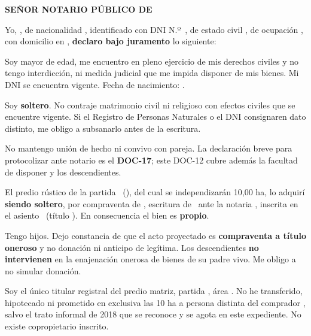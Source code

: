 \documentclass[12pt,a4paper]{article}
\begin{document}


\noindent \textbf{SEÑOR NOTARIO PÚBLICO DE \MakeUppercase{\NotariaCiudad}}

\vspace{0.2em}
\noindent Yo, \textbf{\VendedorNombreCompleto}, de nacionalidad \VendedorNacionalidad, identificado con DNI N.º\ \textbf{\VendedorDNI}, de estado civil \textbf{\VendedorEstadoCivil}, de ocupación \VendedorOcupacion, con domicilio en \VendedorDomicilio, \textbf{declaro bajo juramento} lo siguiente:

Soy mayor de edad, me encuentro en pleno ejercicio de mis derechos civiles y no tengo interdicción, ni medida judicial que me impida disponer de mis bienes. Mi DNI se encuentra vigente. Fecha de nacimiento: \VendedorFechaNac.

Soy \textbf{soltero}. No contraje matrimonio civil ni religioso con efectos civiles que se encuentre vigente. Si el Registro de Personas Naturales o el DNI consignaren dato distinto, me obligo a subsanarlo antes de la escritura.

No mantengo unión de hecho ni convivo con pareja. La declaración breve para protocolizar ante notario es el \textbf{DOC-17}; este DOC-12 cubre además la facultad de disponer y los descendientes.

El predio rústico de la partida \PartidaMatriz\ (\OficinaRegistral), del cual se independizarán 10,00 ha, lo adquirí \textbf{siendo soltero}, por compraventa de \VendedoresAnteriores, escritura de \FechaAdquisicionMatriz\ ante la notaria \NotarioAdquisicion, inscrita en el asiento \AsientoDominio\ (título \TituloSunarpDominio). En consecuencia el bien es \textbf{propio}.

Tengo hijos. Dejo constancia de que el acto proyectado es \textbf{compraventa a título oneroso} y no donación ni anticipo de legítima. Los descendientes \textbf{no intervienen} en la enajenación onerosa de bienes de su padre vivo. Me obligo a no simular donación.

Soy el único titular registral del predio matriz, partida \PartidaMatriz, área \AreaMatriz. No he transferido, hipotecado ni prometido en exclusiva las 10 ha a persona distinta del comprador \CompradorNombreCompleto, salvo el trato informal de 2018 que se reconoce y se agota en este expediente. No existe copropietario inscrito.
\end{document}
